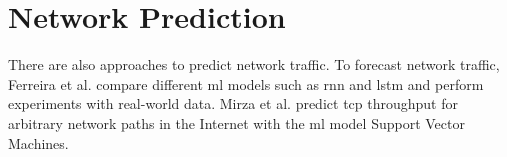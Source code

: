 \section{Network Prediction}

There are also approaches to predict network traffic.
To forecast network traffic, Ferreira et al. \cite{ferreiraForecastingNetworkTraffic2023} compare different \ac{ml} models such as \ac{rnn} and \ac{lstm} and perform experiments with real-world data.
Mirza et al. \cite{mirzaMachineLearningApproach2007} predict \ac{tcp} throughput for arbitrary network paths in the Internet with the \ac{ml} model Support Vector Machines.

